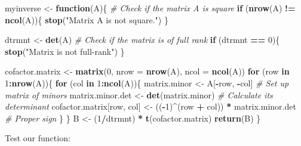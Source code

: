 \documentclass[]{article}
\newenvironment{Shaded}{\begin{snugshade}}{\end{snugshade}}
\newcommand{\KeywordTok}[1]{\textcolor[rgb]{0.13,0.29,0.53}{\textbf{#1}}}
\newcommand{\DataTypeTok}[1]{\textcolor[rgb]{0.13,0.29,0.53}{#1}}
\newcommand{\DecValTok}[1]{\textcolor[rgb]{0.00,0.00,0.81}{#1}}
\newcommand{\StringTok}[1]{\textcolor[rgb]{0.31,0.60,0.02}{#1}}
\newcommand{\CommentTok}[1]{\textcolor[rgb]{0.56,0.35,0.01}{\textit{#1}}}
\newcommand{\ControlFlowTok}[1]{\textcolor[rgb]{0.13,0.29,0.53}{\textbf{#1}}}
\newcommand{\OperatorTok}[1]{\textcolor[rgb]{0.81,0.36,0.00}{\textbf{#1}}}
\newcommand{\NormalTok}[1]{#1}
\begin{document}
\begin{Shaded}
\begin{Highlighting}[]
\NormalTok{myinverse <-}\StringTok{ }\ControlFlowTok{function}\NormalTok{(A)\{}
  \CommentTok{# Check if the matrix A is square}
  \ControlFlowTok{if}\NormalTok{ (}\KeywordTok{nrow}\NormalTok{(A) }\OperatorTok{!=}\StringTok{ }\KeywordTok{ncol}\NormalTok{(A))\{}
    \KeywordTok{stop}\NormalTok{(}\StringTok{"Matrix A is not square."}\NormalTok{)}
\NormalTok{  \}}
  
\NormalTok{  dtrmnt <-}\StringTok{ }\KeywordTok{det}\NormalTok{(A)}
  \CommentTok{# Check if the matrix is of full rank}
  \ControlFlowTok{if}\NormalTok{ (dtrmnt }\OperatorTok{==}\StringTok{ }\DecValTok{0}\NormalTok{)\{}
    \KeywordTok{stop}\NormalTok{(}\StringTok{"Matrix is not full-rank"}\NormalTok{)}
\NormalTok{  \}}
  
\NormalTok{  cofactor.matrix <-}\StringTok{ }\KeywordTok{matrix}\NormalTok{(}\DecValTok{0}\NormalTok{, }\DataTypeTok{nrow =} \KeywordTok{nrow}\NormalTok{(A), }\DataTypeTok{ncol =} \KeywordTok{ncol}\NormalTok{(A))}
  \ControlFlowTok{for}\NormalTok{ (row }\ControlFlowTok{in} \DecValTok{1}\OperatorTok{:}\KeywordTok{nrow}\NormalTok{(A))\{}
    \ControlFlowTok{for}\NormalTok{ (col }\ControlFlowTok{in} \DecValTok{1}\OperatorTok{:}\KeywordTok{ncol}\NormalTok{(A))\{}
\NormalTok{      matrix.minor <-}\StringTok{ }\NormalTok{A[}\OperatorTok{-}\NormalTok{row, }\OperatorTok{-}\NormalTok{col] }\CommentTok{# Set up matrix of minors}
\NormalTok{      matrix.minor.det <-}\StringTok{ }\KeywordTok{det}\NormalTok{(matrix.minor) }\CommentTok{# Calculate its determinant}
\NormalTok{      cofactor.matrix[row, col] <-}\StringTok{ }\NormalTok{((}\OperatorTok{-}\DecValTok{1}\NormalTok{)}\OperatorTok{^}\NormalTok{(row }\OperatorTok{+}\StringTok{ }\NormalTok{col)) }\OperatorTok{*}\StringTok{ }\NormalTok{matrix.minor.det }\CommentTok{# Proper sign}
\NormalTok{    \}}
\NormalTok{  \}}
\NormalTok{  B <-}\StringTok{ }\NormalTok{(}\DecValTok{1}\OperatorTok{/}\NormalTok{dtrmnt) }\OperatorTok{*}\StringTok{ }\KeywordTok{t}\NormalTok{(cofactor.matrix)}
  \KeywordTok{return}\NormalTok{(B)}
\NormalTok{\}}
\end{Highlighting}
\end{Shaded}

Test our function:
\end{document}
